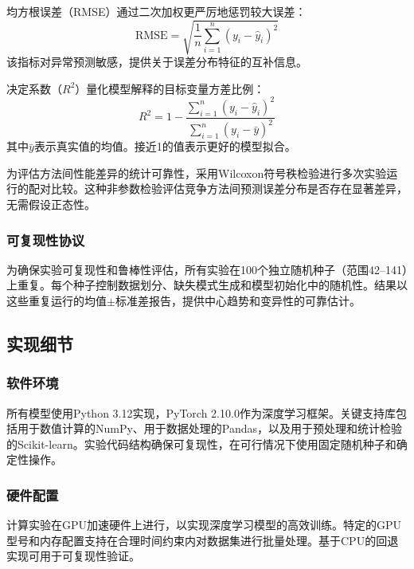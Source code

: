 \documentclass[10pt,a4paper]{ctexart}
\begin{document}
均方根误差（RMSE）通过二次加权更严厉地惩罚较大误差：
\begin{equation}
    \text{RMSE} = \sqrt{\frac{1}{n} \sum_{i=1}^{n} (y_i - \hat{y}_i)^2}
\end{equation}
该指标对异常预测敏感，提供关于误差分布特征的互补信息。

决定系数（$R^2$）量化模型解释的目标变量方差比例：
\begin{equation}
    R^2 = 1 - \frac{\sum_{i=1}^{n} (y_i - \hat{y}_i)^2}{\sum_{i=1}^{n} (y_i - \bar{y})^2}
\end{equation}
其中$\bar{y}$表示真实值的均值。接近1的值表示更好的模型拟合。

为评估方法间性能差异的统计可靠性，采用Wilcoxon符号秩检验进行多次实验运行的配对比较。这种非参数检验评估竞争方法间预测误差分布是否存在显著差异，无需假设正态性。

\subsubsection{可复现性协议}

为确保实验可复现性和鲁棒性评估，所有实验在100个独立随机种子（范围42--141）上重复。每个种子控制数据划分、缺失模式生成和模型初始化中的随机性。结果以这些重复运行的均值$\pm$标准差报告，提供中心趋势和变异性的可靠估计。

\subsection{实现细节}\label{sec:implementation}

\subsubsection{软件环境}

所有模型使用Python 3.12实现，PyTorch 2.10.0作为深度学习框架。关键支持库包括用于数值计算的NumPy、用于数据处理的Pandas，以及用于预处理和统计检验的Scikit-learn。实验代码结构确保可复现性，在可行情况下使用固定随机种子和确定性操作。

\subsubsection{硬件配置}

计算实验在GPU加速硬件上进行，以实现深度学习模型的高效训练。特定的GPU型号和内存配置支持在合理时间约束内对数据集进行批量处理。基于CPU的回退实现可用于可复现性验证。
\end{document}
